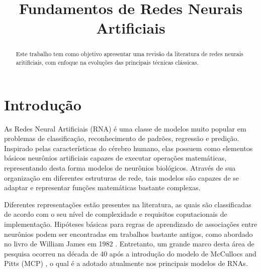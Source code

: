 \documentclass[conference]{IEEEtran}
\begin{document}
	
	\title{Fundamentos de Redes Neurais Artificiais}
	
	
	\author{
		}
	
	
	
	\maketitle
	
	\begin{abstract}
		Este trabalho tem como objetivo apresentar uma revisão da literatura de redes neurais aritificiais, com enfoque na evoluções das principais técnicas clássicas. 
	\end{abstract}

	\section{Introdução}
	As Redes Neural Artificiais (RNA) é uma classe de modelos muito popular em problemas de classificação, reconhecimento de padrões, regressão e predição. Inspirado pelas características do cérebro humano, elas possuem como elementos básicos neurônios artificiais capazes de executar operações matemáticas, representando desta forma modelos de neurônios biológicos. Através de sua organização em diferentes estruturas de rede, tais modelos são capazes de se adaptar e representar funções matemáticas bastante complexas. 
	
	Diferentes representações estão presentes na literatura, as quais são classificadas de acordo com o seu nível de complexidade e requisitos coputacionais de implementação. Hipóteses básicas para regras de aprendizado de associações entre neurônios podem ser encontradas em trabalhos bastante antigos, como abordado no livro de William James em 1982 \cite{james1984psychology}. Entretanto, um grande marco desta área de pesquisa ocorreu na década de 40 após a introdução do modelo de McCullocs and Pitts (MCP) \cite{mcculloch1943logical}, o qual é a adotado atualmente nos principais modelos de RNAs.
	
\end{document}
